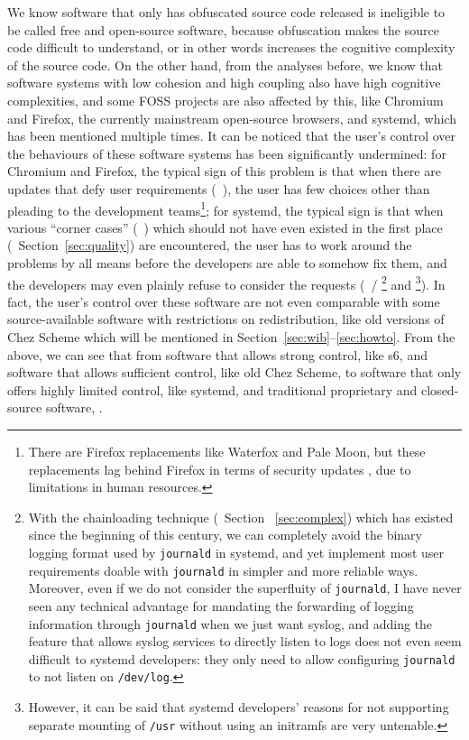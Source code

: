 We know software that only has obfuscated source code released is ineligible
to be called free and open-source software, because obfuscation makes the
source code difficult to understand, or in other words increases the cognitive
complexity of the source code.  On the other hand, from the analyses before,
we know that software systems with low cohesion and high coupling also have
high cognitive complexities, and some FOSS projects are also affected by
this, like Chromium and Firefox, the currently mainstream open-source browsers,
and systemd, which has been mentioned multiple times.  It can be noticed
that the user's control over the behaviours of these software systems has
been significantly undermined: for Chromium and Firefox, the typical sign
of this problem is that when there are updates that defy user requirements
(\eg~\parencite{beauhd2019, namelessvoice2018}), the user has few choices
other than pleading to the development teams\footnote{There are Firefox
replacements like Waterfox and Pale Moon, but these replacements lag behind
Firefox in terms of security updates \etc, due to limitations in human
resources.}; for systemd, the typical sign is that
when various ``corner cases'' (\eg~\parencite{ratagupt2017}) which should
not have even existed in the first place (\cf~Section~\ref{sec:quality})
are encountered, the user has to work around the problems by all means before
the developers are able to somehow fix them, and the developers may even
plainly refuse to consider the requests (\eg~\parencite{akcaagac2013}/%
\parencite{junta2017}\footnote{With the chainloading technique (\cf~Section~%
\ref{sec:complex}) which has existed since the beginning of this century, we
can completely avoid the binary logging format used by \texttt{journald} in
systemd, and yet implement most user requirements doable with \texttt{journald}
in simpler and more reliable ways.  Moreover, even if we do not consider the
superfluity of \texttt{journald}, I have never seen any technical advantage
for mandating the forwarding of logging information through \texttt{journald}
when we just want syslog, and adding the feature that allows syslog
services to directly listen to logs does not even seem difficult to systemd
developers: they only need to allow configuring \texttt{journald} to not
listen on \texttt{/dev/log}.} and \parencite{freedesktop:sepusr}\footnote%
{However, it can be said that systemd developers' reasons for not supporting
separate mounting of \texttt{/usr} without using an initramfs are very
untenable.}).  In fact, the user's control over
these software are not even comparable with some source-available software
with restrictions on redistribution, like old versions of Chez Scheme which
will be mentioned in Section~\ref{sec:wib}--\ref{sec:howto}.  From the above,
we can see that from software that allows strong control, like s6, and software
that allows sufficient control, like old Chez Scheme, to software that only
offers highly limited control, like systemd, and traditional proprietary and
closed-source software, .

